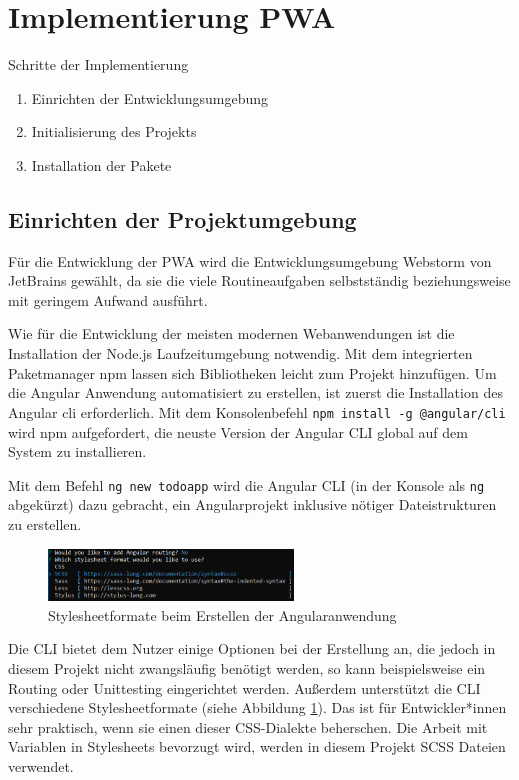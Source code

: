 \newpage
\section{Implementierung PWA}
Schritte der Implementierung
\begin{enumerate}
	\item Einrichten der Entwicklungsumgebung
	\item Initialisierung des Projekts
	\item Installation der Pakete
\end{enumerate}

\subsection{Einrichten der Projektumgebung}
Für die Entwicklung der PWA wird die Entwicklungsumgebung Webstorm von JetBrains gewählt, da sie die viele Routineaufgaben selbstständig beziehungsweise mit geringem Aufwand ausführt.

Wie für die Entwicklung der meisten modernen Webanwendungen ist die Installation der Node.js Laufzeitumgebung notwendig. Mit dem integrierten Paketmanager npm lassen sich Bibliotheken leicht zum Projekt hinzufügen.
Um die Angular Anwendung automatisiert zu erstellen, ist zuerst die Installation des Angular \acf{cli} erforderlich. Mit dem Konsolenbefehl \texttt{npm install -g @angular/cli} wird npm aufgefordert, die neuste Version der Angular CLI global auf dem System zu installieren.


Mit dem Befehl \texttt{ng new todoapp} wird die Angular CLI (in der Konsole als \texttt{ng} abgekürzt) dazu gebracht, ein Angularprojekt inklusive nötiger Dateistrukturen zu erstellen.
\begin{figure}
	\vspace{-10pt}
	\includegraphics[width=0.58\textwidth]{img/angular_cli_css.PNG}
	\caption{Stylesheetformate beim Erstellen der Angularanwendung}
	\label{fig:stylesheet_formate_cli}
	\vspace{-10pt}
\end{figure}
Die CLI bietet dem Nutzer einige Optionen bei der Erstellung an, die jedoch in diesem Projekt nicht zwangsläufig benötigt werden, so kann beispielsweise ein Routing oder Unittesting eingerichtet werden.
Außerdem unterstützt die CLI verschiedene Stylesheetformate (siehe Abbildung \ref{fig:stylesheet_formate_cli}). Das ist für Entwickler*innen sehr praktisch, wenn sie einen dieser CSS-Dialekte beherschen. Die Arbeit mit Variablen in Stylesheets bevorzugt wird, werden in diesem Projekt SCSS Dateien verwendet.


